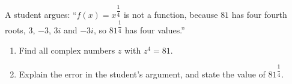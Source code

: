A student argues: ``$f(x)=x^{\dfrac{1}{4}}$ is not a function, because $81$ has four fourth roots, $3$, $-3$, $3i$ and $-3i$, so $81^{\dfrac{1}{4}}$ has four values.''
\begin{enumerate}
\item[(a)] Find all complex numbers $z$ with $z^4=81$.
\item[(b)] Explain the error in the student's argument, and state the value of $81^{\dfrac{1}{4}}$.
\end{enumerate}
